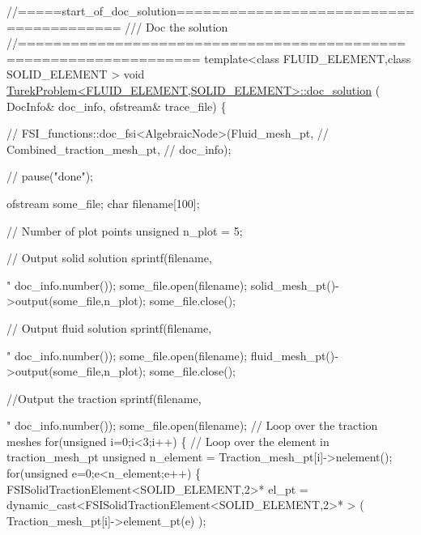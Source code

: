 \begin{DoxyCodeInclude}
\textcolor{comment}{//=====start\_of\_doc\_solution========================================}
\textcolor{comment}{/// Doc the solution}
\textcolor{comment}{}\textcolor{comment}{//==================================================================}
\textcolor{keyword}{template}<\textcolor{keyword}{class} FLUID\_ELEMENT,\textcolor{keyword}{class} SOLID\_ELEMENT >
\textcolor{keywordtype}{void} \hyperlink{classTurekProblem_a2cf0eb1610b4c3a7cdbd3c7948cdd46e}{TurekProblem<FLUID\_ELEMENT,SOLID\_ELEMENT>::doc\_solution}
      (
 DocInfo& doc\_info, ofstream& trace\_file)
\{
 
\textcolor{comment}{//  FSI\_functions::doc\_fsi<AlgebraicNode>(Fluid\_mesh\_pt,}
\textcolor{comment}{//                                        Combined\_traction\_mesh\_pt,}
\textcolor{comment}{//                                        doc\_info);}

\textcolor{comment}{//  pause("done");}

 ofstream some\_file;
 \textcolor{keywordtype}{char} filename[100];

 \textcolor{comment}{// Number of plot points}
 \textcolor{keywordtype}{unsigned} n\_plot = 5; 

 \textcolor{comment}{// Output solid solution}
 sprintf(filename,\textcolor{stringliteral}{"%
         doc\_info.number());
 some\_file.open(filename);
 solid\_mesh\_pt()->output(some\_file,n\_plot);
 some\_file.close();
 
 \textcolor{comment}{// Output fluid solution}
 sprintf(filename,\textcolor{stringliteral}{"%
         doc\_info.number());
 some\_file.open(filename);
 fluid\_mesh\_pt()->output(some\_file,n\_plot);
 some\_file.close();


\textcolor{comment}{//Output the traction}
 sprintf(filename,\textcolor{stringliteral}{"%
         doc\_info.number());
 some\_file.open(filename);
\textcolor{comment}{// Loop over the traction meshes}
 \textcolor{keywordflow}{for}(\textcolor{keywordtype}{unsigned} i=0;i<3;i++)
  \{
   \textcolor{comment}{// Loop over the element in traction\_mesh\_pt}
   \textcolor{keywordtype}{unsigned} n\_element = Traction\_mesh\_pt[i]->nelement();
   \textcolor{keywordflow}{for}(\textcolor{keywordtype}{unsigned} e=0;e<n\_element;e++)
    \{
     FSISolidTractionElement<SOLID\_ELEMENT,2>* el\_pt = 
      \textcolor{keyword}{dynamic\_cast<}FSISolidTractionElement<SOLID\_ELEMENT,2>* \textcolor{keyword}{>} (
       Traction\_mesh\_pt[i]->element\_pt(e) );
     
}}}
\end{DoxyCodeInclude}
